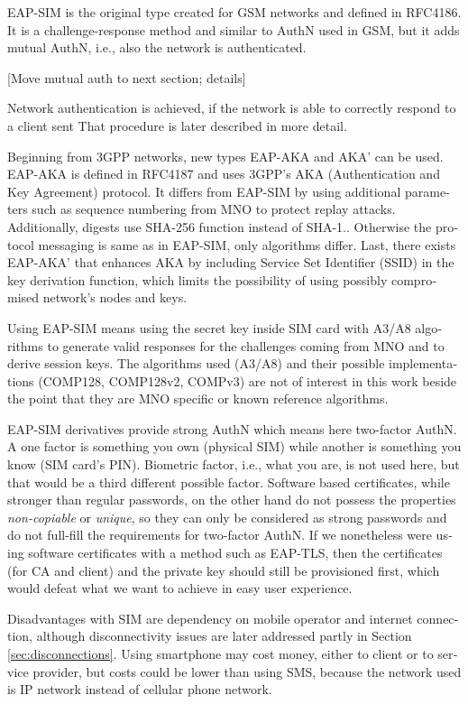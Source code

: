 \documentclass[12pt,a4paper,english]{tutthesis}
\begin{document}
\begin{otherlanguage}{english}
EAP-SIM is the original type created for GSM networks and defined 
in RFC4186\cite{rfc4186}.
It is a challenge-response method and similar to AuthN used in GSM, 
but it adds mutual AuthN, i.e., also the network is authenticated.

[Move mutual auth to next section; details]

Network authentication is achieved, if 
the network is able to correctly respond to a client sent
That procedure is later described in more detail.

Beginning from 3GPP networks, new types EAP-AKA and AKA' can be used.
EAP-AKA is defined in RFC4187\cite{rfc4187} and 
uses 3GPP's AKA (Authentication and Key Agreement) protocol.
It differs from EAP-SIM by using additional parameters such as
sequence numbering from MNO to protect replay attacks. 
Additionally, digests use SHA-256 function instead of SHA-1.\cite{rfc5448}.
Otherwise the protocol messaging is same as in  EAP-SIM, only algorithms differ.
Last, there exists EAP-AKA' that enhances AKA by including Service Set
Identifier (SSID) 
in the key derivation function, which limits the possibility of using possibly
compromised network's nodes and keys. 


  Using EAP-SIM means using the secret key inside SIM card with A3/A8
algorithms to generate valid responses for the challenges coming from 
MNO and to derive session keys.  The algorithms used (A3/A8) and their
possible implementations (COMP128, COMP128v2, COMPv3) are not of
interest in this work beside the point that they are MNO specific or known reference algorithms.


EAP-SIM derivatives provide strong AuthN which means here two-factor
AuthN. A one factor  is something you own (physical SIM) while  
another
is  something you know (SIM card's PIN). Biometric factor, i.e., what you are,
is not used here, but that would be a third different possible factor.
Software based certificates, while stronger than regular passwords,
on the other hand do not possess the properties \emph{non-copiable} or
\emph{unique}, so they can only be considered as strong passwords and 
do not full-fill the requirements for two-factor AuthN.  If we nonetheless
were using software certificates with a method such as EAP-TLS, then the
certificates (for CA and client) and the private key should still be
provisioned first, which would defeat what we want to achieve in
easy user experience.


Disadvantages with SIM are dependency on mobile operator and internet
connection, although disconnectivity issues are later addressed
partly in Section \ref{sec:disconnections}.
Using smartphone may cost money, either to client or to service
provider, but costs could be lower than using SMS, because 
the network  used is IP network instead of cellular phone network.


\end{otherlanguage}
\end{document}
